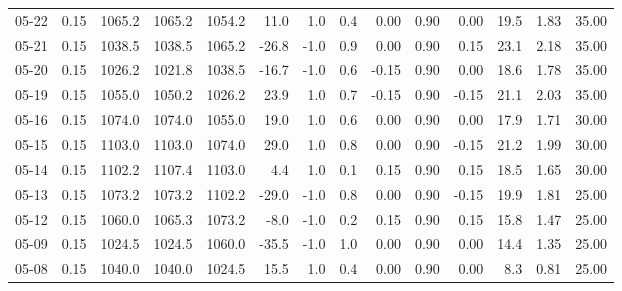 \begin{threeparttable}
{\begin{tabular}{lrrrrrrrrrrrrr}
  05-22 &     0.15 & 1065.2 & 1065.2 & 1054.2 &       11.0 &                      1.0 &                 0.4 &       0.00 &      0.90 &           0.00 &             19.5 &            1.83 &                  35.00 \\
  05-21 &     0.15 & 1038.5 & 1038.5 & 1065.2 &      -26.8 &                     -1.0 &                 0.9 &       0.00 &      0.90 &           0.15 &             23.1 &            2.18 &                  35.00 \\
  05-20 &     0.15 & 1026.2 & 1021.8 & 1038.5 &      -16.7 &                     -1.0 &                 0.6 &      -0.15 &      0.90 &           0.00 &             18.6 &            1.78 &                  35.00 \\
  05-19 &     0.15 & 1055.0 & 1050.2 & 1026.2 &       23.9 &                      1.0 &                 0.7 &      -0.15 &      0.90 &          -0.15 &             21.1 &            2.03 &                  35.00 \\
  05-16 &     0.15 & 1074.0 & 1074.0 & 1055.0 &       19.0 &                      1.0 &                 0.6 &       0.00 &      0.90 &           0.00 &             17.9 &            1.71 &                  30.00 \\
  05-15 &     0.15 & 1103.0 & 1103.0 & 1074.0 &       29.0 &                      1.0 &                 0.8 &       0.00 &      0.90 &          -0.15 &             21.2 &            1.99 &                  30.00 \\
  05-14 &     0.15 & 1102.2 & 1107.4 & 1103.0 &        4.4 &                      1.0 &                 0.1 &       0.15 &      0.90 &           0.15 &             18.5 &            1.65 &                  30.00 \\
  05-13 &     0.15 & 1073.2 & 1073.2 & 1102.2 &      -29.0 &                     -1.0 &                 0.8 &       0.00 &      0.90 &          -0.15 &             19.9 &            1.81 &                  25.00 \\
  05-12 &     0.15 & 1060.0 & 1065.3 & 1073.2 &       -8.0 &                     -1.0 &                 0.2 &       0.15 &      0.90 &           0.15 &             15.8 &            1.47 &                  25.00 \\
  05-09 &     0.15 & 1024.5 & 1024.5 & 1060.0 &      -35.5 &                     -1.0 &                 1.0 &       0.00 &      0.90 &           0.00 &             14.4 &            1.35 &                  25.00 \\
  05-08 &     0.15 & 1040.0 & 1040.0 & 1024.5 &       15.5 &                      1.0 &                 0.4 &       0.00 &      0.90 &           0.00 &              8.3 &            0.81 &                  25.00 \\

\end{tabular}}
\end{threeparttable}
